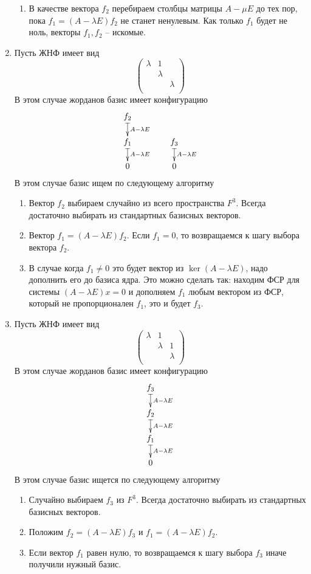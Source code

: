 \documentclass{article}
\begin{document}
\begin{enumerate}
\begin{enumerate}
\item В качестве вектора $f_2$ перебираем столбцы матрицы $A - \mu E$ до тех пор, пока $f_1 = (A - \lambda E) f_2$ не станет ненулевым.
Как только $f_1$ будет не ноль, векторы $f_1, f_2$ -- искомые.
\end{enumerate}

\item Пусть ЖНФ имеет вид
\[
\begin{pmatrix}
{\lambda}&{1}&{}\\
{}&{\lambda}&{}\\
{}&{}&{\lambda}\\
\end{pmatrix}
\]
В этом случае жорданов базис имеет конфигурацию
\[
\xymatrix@R=15pt@C=40pt{
  {f_2}\ar@{|->}[d]^{A-\lambda E}&{}\\
  {f_1}\ar@{|->}[d]^{A-\lambda E}&{f_3}\ar@{|->}[d]^{A-\lambda E}\\
  {0}&{0}
}
\]
В этом случае базис ищем по следующему алгоритму
\begin{enumerate}
\item Вектор $f_2$ выбираем случайно из всего пространства $F^3$.
Всегда достаточно выбирать из стандартных базисных векторов.

\item Вектор $f_1 = (A - \lambda E) f_2$.
Если $f_1 = 0$, то возвращаемся к шагу выбора вектора $f_2$.

\item В случае когда $f_1\neq 0$ это будет вектор из $\ker (A - \lambda E)$, надо дополнить его до базиса ядра.
Это можно сделать так: находим ФСР для системы $(A - \lambda E) x = 0$ и дополняем $f_1$ любым вектором из ФСР, который не пропорционален $f_1$, это и будет $f_3$.
\end{enumerate}

\item Пусть ЖНФ имеет вид
\[
\begin{pmatrix}
{\lambda}&{1}&{}\\
{}&{\lambda}&{1}\\
{}&{}&{\lambda}\\
\end{pmatrix}
\]
В этом случае жорданов базис имеет конфигурацию
\[
\xymatrix@R=15pt@C=40pt{
  {f_3}\ar@{|->}[d]^{A-\lambda E}\\
  {f_2}\ar@{|->}[d]^{A-\lambda E}\\
  {f_1}\ar@{|->}[d]^{A-\lambda E}\\
  {0}
}
\]
В этом случае базис ищется по следующему алгоритму
\begin{enumerate}
\item Случайно выбираем $f_3$ из $F^3$.
Всегда достаточно выбирать из стандартных базисных векторов.

\item Положим $f_2 = (A - \lambda E) f_3$ и $f_1 = (A - \lambda E) f_2$.

\item Если вектор $f_1$ равен нулю, то возвращаемся к шагу выбора $f_3$ иначе получили нужный базис.
\end{enumerate}
\end{enumerate}
\end{document}
